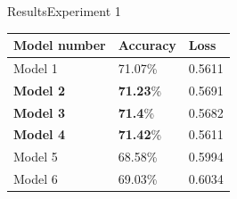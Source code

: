\documentclass[
]{beamer}
\begin{document}
\begin{frame}{Results}{Experiment 1}

\begin{center}
    \begin{tabular}{|p{3cm}||p{3cm}|p{3cm}|  }
     \hline
    Model number	& Accuracy & Loss \\
     \hline
    Model 1 & 71.07\% & 0.5611\\
    \textbf{Model 2} & \textbf{71.23}\% & 0.5691\\
    \textbf{Model 3} & \textbf{71.4}\% & 0.5682\\
    \textbf{Model 4} & \textbf{71.42}\% & 0.5611\\
    Model 5 & 68.58\% & 0.5994\\
    Model 6 & 69.03\% & 0.6034\\
     \hline
    \end{tabular}
\end{center}

\end{frame}
\end{document}
